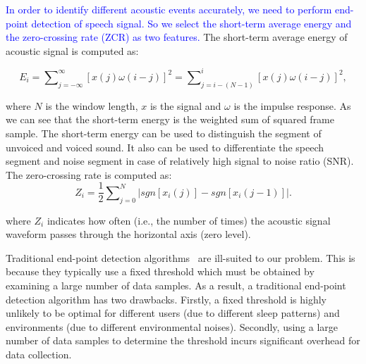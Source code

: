 \textcolor{blue}{In order to identify different acoustic events accurately, we need to perform end-point detection of speech signal. So we select the short-term average energy and the zero-crossing rate (ZCR) as two features.} The short-term average energy of acoustic signal is computed as:

\begin{equation}
  E_i=\sum\nolimits_{j=-\infty}^{\infty}[x(j)\omega(i-j)]^2=\sum\nolimits_{j=i-(N-1)}^{i}[x(j)\omega(i-j)]^2,
  \label{eq:shorte}
\end{equation}

where $N$ is the window length, $x$ is the signal and $\omega$ is the impulse response. As we can see that the short-term energy is the
weighted sum of squared frame sample. The short-term energy can be used to distinguish the segment of unvoiced and voiced sound. It also
can be used to differentiate the speech segment and noise segment  in  case of relatively high signal to noise ratio (SNR). The
zero-crossing rate is computed as:
\begin{equation}
  Z_i = \frac{1}{2}\sum\nolimits_{j=0}^{N}|sgn[x_i(j)]-sgn[x_i(j-1)]|.
  \label{eq:zeroc}
\end{equation}


where $Z_i$ indicates how often (i.e., the number of times) the acoustic signal waveform passes through the horizontal axis (zero level).



 Traditional end-point detection algorithms~\cite{endpoint2008} are
ill-suited to our problem. This is because they typically use a fixed threshold which must be obtained by examining a large number of data
samples. As a result, a traditional end-point detection algorithm has two drawbacks. Firstly, a fixed threshold is highly unlikely to be
optimal for different users (due to different sleep patterns) and environments (due to different environmental noises). Secondly, using a
large number of data samples to determine the threshold incurs significant overhead for data collection.


